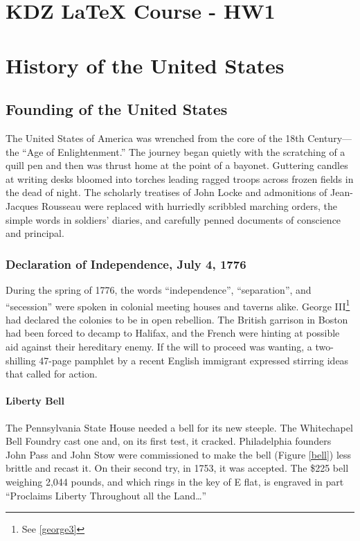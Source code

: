 \documentclass{report}
\begin{document}
\part*{KDZ LaTeX Course - HW1}


\hypersetup{linkcolor=green}
\tableofcontents
\listoffigures

\hypersetup{linkcolor=blue}

\part{History of the United States}

\chapter{Founding of the United States}
The United States of America was wrenched from the core of the 18th Century—the “Age of Enlightenment.” 
The journey began quietly with the scratching of a quill pen and then was thrust home at the point of a 
bayonet. Guttering candles at writing desks bloomed into torches leading ragged troops across frozen fields 
in the dead of night. The scholarly treatises of John Locke and admonitions of Jean-Jacques Rousseau were replaced 
with hurriedly scribbled marching orders, the simple words in soldiers’ diaries, and carefully penned documents of 
conscience and principal.

\section{Declaration of Independence, July 4, 1776}
During the spring of 1776, the words “independence”, 
“separation”, and “secession” were spoken in colonial 
meeting houses and taverns alike. George III\footnote{See \autoref{george3}} had declared 
the colonies to be in open rebellion. The British garrison in Boston 
had been forced to decamp to Halifax, and the French were 
hinting at possible aid against their hereditary enemy. If the will to 
proceed was wanting, a two-shilling 47-page pamphlet by a recent 
English immigrant expressed stirring ideas that called for action.

\subsection{Liberty Bell \faBell}
The Pennsylvania State House needed a bell for 
its new steeple. The Whitechapel Bell Foundry 
cast one and, on its first test, it cracked. 
Philadelphia founders John Pass and John Stow 
were commissioned to make the bell (Figure \ref{bell}) less brittle 
and recast it. On their second try, in 1753, it was 
accepted. The \$225 bell weighing 2,044 pounds, 
and which rings in the key of E flat, is engraved in 
part “Proclaims Liberty Throughout all the Land…”
\end{document}
